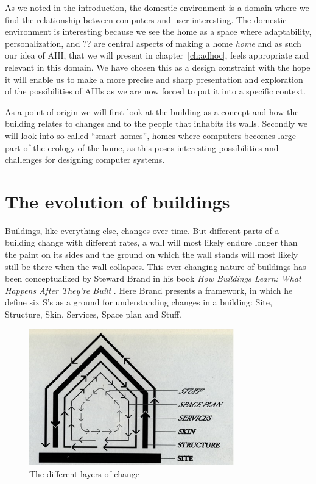 As we noted in the introduction, the domestic environment is a domain where we find the relationship between computers and user interesting.
The domestic environment is interesting because we see the home as a space where adaptability, personalization, and ??  are central aspects of making a home \emph{home} and as such our idea of AHI, that we will present in chapter~\ref{ch:adhoc}, feels appropriate and relevant in this domain.
We have chosen this as a design constraint with the hope it will enable us to make a more precise and sharp presentation and exploration of the possibilities of AHIs as we are now forced to put it into a specific context.

As a point of origin we will first look at the building as a concept and how the building relates to changes and to the people that inhabits its walls.
Secondly we will look into so called ``smart homes'', homes where computers becomes large part of the ecology of the home, as this poses interesting possibilities and challenges for designing computer systems.

\section{The evolution of buildings}
Buildings, like everything else, changes over time.
But different parts of a building change with different rates, a wall will most likely endure longer than the paint on its sides and the ground on which the wall stands will most likely still be there when the wall collapses.
This ever changing nature of buildings has been conceptualized by Steward Brand in his book \emph{How Buildings Learn: What Happens After They're Built} \citep{brand1995buildings}.
Here Brand presents a framework, in which he define six S's as a ground for understanding changes in a building: Site, Structure, Skin, Services, Space plan and Stuff.

\begin{figure}[h]
	\centering
  		\includegraphics[width=3.5in]{figures/brand-diagram}
	\caption{The different layers of change \citep[chapter 2]{brand1995buildings}}
   \label{brand-diagram}
\end{figure}

